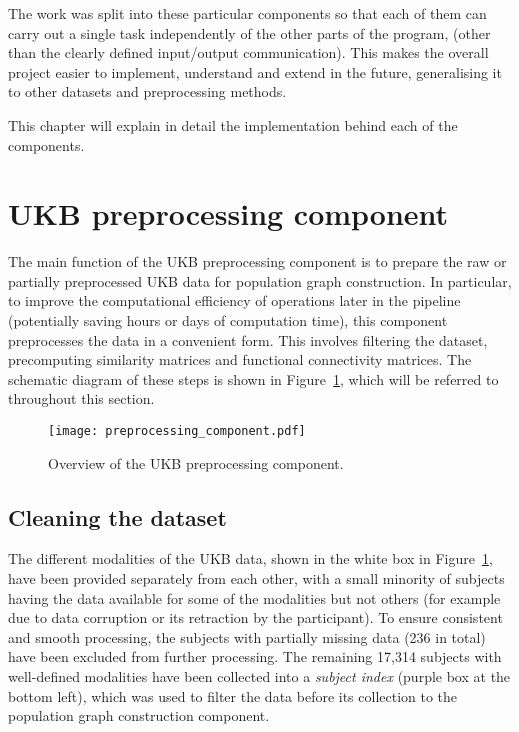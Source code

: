 The work was split into these particular components so that each of them can carry out a single task independently of the other parts of the program, (other than the clearly defined input/output communication). This makes the overall project easier to implement, understand and extend in the future, generalising it to other datasets and preprocessing methods. 

This chapter will explain in detail the implementation behind each of the components.

\section{UKB preprocessing component}
\label{section:ukb-preprocessing}

The main function of the UKB preprocessing component is to prepare the raw or partially preprocessed UKB data for population graph construction. In particular, to improve the computational efficiency of operations later in the pipeline (potentially saving hours or days of computation time), this component preprocesses the data in a convenient form. This involves filtering the dataset, precomputing similarity matrices and functional connectivity matrices. The schematic diagram of these steps is shown in Figure~\ref{preprocessing-component}, which will be referred to throughout this section.

\begin{figure}[h]
    \centering
    \texttt{[image: preprocessing\_component.pdf]}
    \caption{Overview of the UKB preprocessing component.}\label{preprocessing-component}
\end{figure}

\subsection{Cleaning the dataset}
The different modalities of the UKB data, shown in the white box in Figure~\ref{preprocessing-component}, have been provided separately from each other, with a small minority of subjects having the data available for some of the modalities but not others (for example due to data corruption or its retraction by the participant). To ensure consistent and smooth processing, the subjects with partially missing data (236 in total) have been excluded from further processing. The remaining 17,314 subjects with well-defined modalities have been collected into a \textit{subject index} (purple box at the bottom left), which was used to filter the data before its collection to the population graph construction component.

